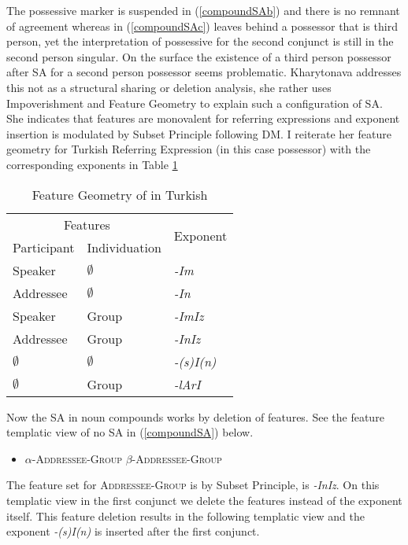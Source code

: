 The possessive marker is suspended in (\ref{compoundSAb}) and there is no remnant of agreement whereas in (\ref{compoundSAc}) leaves behind a possessor that is third person, yet the interpretation of possessive for the second conjunct is still in the second person singular. On the surface the existence of a third person possessor after SA for a second person possessor seems problematic. Kharytonava addresses this not as a structural sharing or deletion analysis, she rather uses Impoverishment and Feature Geometry to explain such a configuration of SA. She indicates that features are monovalent for referring expressions and exponent insertion is modulated by Subset Principle following DM. I reiterate her feature geometry for Turkish Referring Expression (in this case possessor) with the corresponding exponents in Table \ref{tab:kharyfeatures}
\begin{table}[hbt!]
    \caption{Feature Geometry of {\Poss} in Turkish}
    \centering
    \begin{tabular}{|l|l|l|}
    \hline
         \multicolumn{2}{|c|}{Features} & \multirow{2}{*}{Exponent}  \\ \cline{1-2}
         Participant & Individuation  & \\ \hline
         Speaker & $\emptyset$ & \textit{-Im} \\ \hline 
         Addressee & $\emptyset$ & \textit{-In} \\ \hline 
         Speaker & Group & \textit{-ImIz} \\ \hline 
         Addressee & Group & \textit{-InIz} \\ \hline 
         $\emptyset$ & $\emptyset$ & \textit{-(s)I(n)} \\ \hline 
         $\emptyset$ & Group & \textit{-lArI} \\ \hline 
    \end{tabular}
    \label{tab:kharyfeatures}
\end{table}

Now the SA in noun compounds works by deletion of features. See the feature templatic view of no SA in (\ref{compoundSA}) below.

\begin{itemize}
    \item $\alpha$-\textsc{Addressee}-\textsc{Group} {\And} $\beta$-{\textsc{Addressee}-\textsc{Group}}
\end{itemize}

The feature set for \textsc{Addressee}-\textsc{Group} is by Subset Principle, is \textit{-InIz}. On this templatic view in the first conjunct we delete the features instead of the exponent itself. This feature deletion results in the following templatic view and the exponent \textit{-(s)I(n)} is inserted after the first conjunct.

